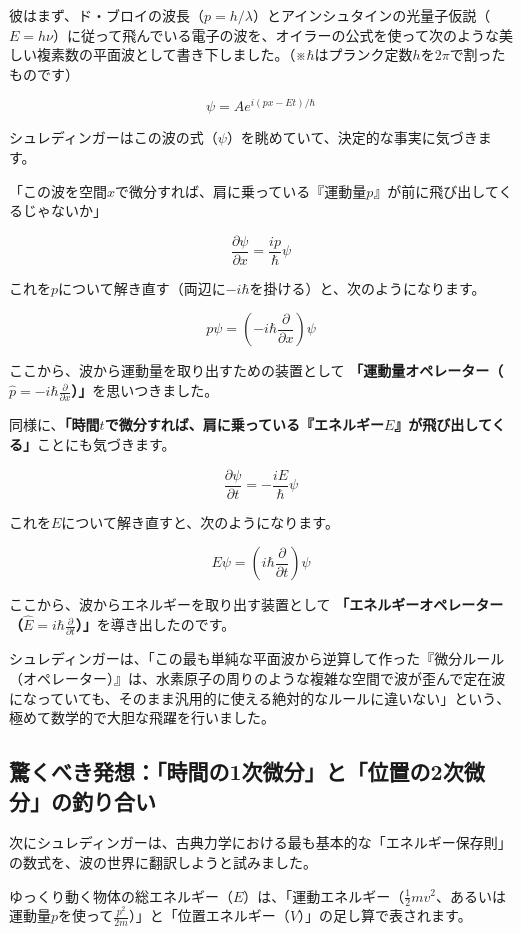 彼はまず、ド・ブロイの波長（\(p = h/\lambda\)）とアインシュタインの光量子仮説（\(E = h\nu\)）に従って飛んでいる電子の波を、オイラーの公式を使って次のような美しい複素数の平面波として書き下しました。（※\(\hbar\)はプランク定数\(h\)を\(2\pi\)で割ったものです）

\[\psi = A e^{i(px - Et)/\hbar}\]

シュレディンガーはこの波の式（\(\psi\)）を眺めていて、決定的な事実に気づきます。

「この波を空間\(x\)で微分すれば、肩に乗っている『運動量\(p\)』が前に飛び出してくるじゃないか」

\[\frac{\partial \psi}{\partial x} = \frac{ip}{\hbar} \psi\]

これを\(p\)について解き直す（両辺に\(-i\hbar\)を掛ける）と、次のようになります。

\[p \psi = \left( -i\hbar \frac{\partial}{\partial x} \right) \psi\]

ここから、波から運動量を取り出すための装置として \textbf{「運動量オペレーター（\(\hat{p} = -i\hbar \frac{\partial}{\partial x}\)）」}を思いつきました。

同様に、\textbf{「時間\(t\)で微分すれば、肩に乗っている『エネルギー\(E\)』が飛び出してくる」}ことにも気づきます。

\[\frac{\partial \psi}{\partial t} = -\frac{iE}{\hbar} \psi\]

これを\(E\)について解き直すと、次のようになります。

\[E \psi = \left( i\hbar \frac{\partial}{\partial t} \right) \psi\]

ここから、波からエネルギーを取り出す装置として \textbf{「エネルギーオペレーター（\(\hat{E} = i\hbar \frac{\partial}{\partial t}\)）」}を導き出したのです。

シュレディンガーは、「この最も単純な平面波から逆算して作った『微分ルール（オペレーター）』は、水素原子の周りのような複雑な空間で波が歪んで定在波になっていても、そのまま汎用的に使える絶対的なルールに違いない」という、極めて数学的で大胆な飛躍を行いました。

\subsection{驚くべき発想：「時間の1次微分」と「位置の2次微分」の釣り合い}

次にシュレディンガーは、古典力学における最も基本的な「エネルギー保存則」の数式を、波の世界に翻訳しようと試みました。

ゆっくり動く物体の総エネルギー（\(E\)）は、「運動エネルギー（\(\frac{1}{2}mv^2\)、あるいは運動量\(p\)を使って\(\frac{p^2}{2m}\)）」と「位置エネルギー（\(V\)）」の足し算で表されます。

